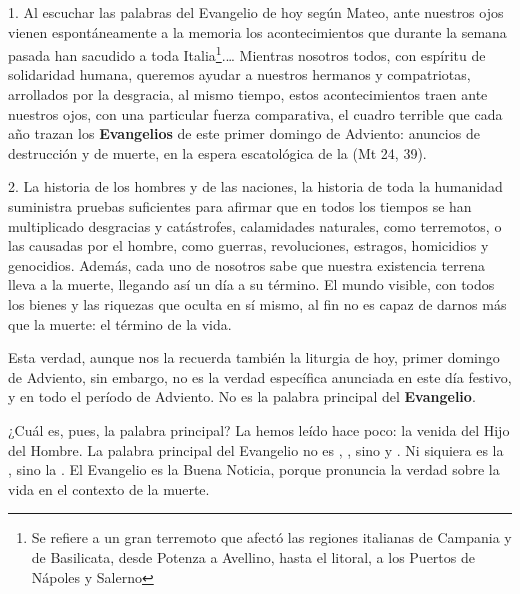 				\begin{body}
			
					
					1. Al escuchar las palabras del Evangelio de hoy según Mateo, ante nuestros ojos vienen espontáneamente a la memoria los acontecimientos que durante la semana pasada han sacudido a toda Italia\footnote{Se refiere a un gran terremoto que afectó las regiones italianas de Campania y de Basilicata, desde Potenza a Avellino, hasta el litoral, a los Puertos de Nápoles y Salerno}.\ldots{} Mientras nosotros todos, con espíritu de solidaridad humana, queremos ayudar a nuestros hermanos y compatriotas, arrollados por la desgracia, al mismo tiempo, estos acontecimientos traen ante nuestros ojos, con una particular fuerza comparativa, el cuadro terrible que cada año trazan los \textbf{Evangelios} de este primer domingo de Adviento: anuncios de destrucción y de muerte, en la espera escatológica de la  (Mt 24, 39). 
					
					2. La historia de los hombres y de las naciones, la historia de toda la humanidad suministra pruebas suficientes para afirmar que en todos los tiempos se han multiplicado desgracias y catástrofes, calamidades naturales, como terremotos, o las causadas por el hombre, como guerras, revoluciones, estragos, homicidios y genocidios. Además, cada uno de nosotros sabe que nuestra existencia terrena lleva a la muerte, llegando así un día a su término. El mundo visible, con todos los bienes y las riquezas que oculta en sí mismo, al fin no es capaz de darnos más que la muerte: el término de la vida. 
					
					Esta verdad, aunque nos la recuerda también la liturgia de hoy, primer domingo de Adviento, sin embargo, no es la verdad específica anunciada en este día festivo, y en todo el período de Adviento. No es la palabra principal del \textbf{Evangelio}. 
					
					¿Cuál es, pues, la palabra principal? La hemos leído hace poco: la venida del Hijo del Hombre. La palabra principal del Evangelio no es , , sino  y . Ni siquiera es la , sino la . El Evangelio es la Buena Noticia, porque pronuncia la verdad sobre la vida en el contexto de la muerte. 
					

\end{body}
